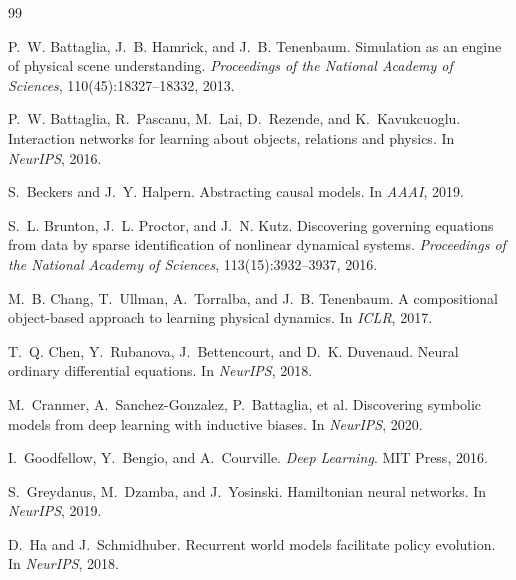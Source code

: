 \documentclass[twoside,11pt]{article}
\begin{document}
\begin{thebibliography}{99}

P.~W. Battaglia, J.~B. Hamrick, and J.~B. Tenenbaum.
\newblock Simulation as an engine of physical scene understanding.
\newblock \emph{Proceedings of the National Academy of Sciences}, 110(45):18327--18332, 2013.

P.~W. Battaglia, R.~Pascanu, M.~Lai, D.~Rezende, and K.~Kavukcuoglu.
\newblock Interaction networks for learning about objects, relations and physics.
\newblock In \emph{NeurIPS}, 2016.

S.~Beckers and J.~Y. Halpern.
\newblock Abstracting causal models.
\newblock In \emph{AAAI}, 2019.

S.~L. Brunton, J.~L. Proctor, and J.~N. Kutz.
\newblock Discovering governing equations from data by sparse identification of nonlinear dynamical systems.
\newblock \emph{Proceedings of the National Academy of Sciences}, 113(15):3932--3937, 2016.

M.~B. Chang, T.~Ullman, A.~Torralba, and J.~B. Tenenbaum.
\newblock A compositional object-based approach to learning physical dynamics.
\newblock In \emph{ICLR}, 2017.

T.~Q. Chen, Y.~Rubanova, J.~Bettencourt, and D.~K. Duvenaud.
\newblock Neural ordinary differential equations.
\newblock In \emph{NeurIPS}, 2018.

M.~Cranmer, A.~Sanchez-Gonzalez, P.~Battaglia, et al.
\newblock Discovering symbolic models from deep learning with inductive biases.
\newblock In \emph{NeurIPS}, 2020.

I.~Goodfellow, Y.~Bengio, and A.~Courville.
\newblock \emph{Deep Learning}.
\newblock MIT Press, 2016.

S.~Greydanus, M.~Dzamba, and J.~Yosinski.
\newblock Hamiltonian neural networks.
\newblock In \emph{NeurIPS}, 2019.

D.~Ha and J.~Schmidhuber.
\newblock Recurrent world models facilitate policy evolution.
\newblock In \emph{NeurIPS}, 2018.


\end{thebibliography}
\end{document}
